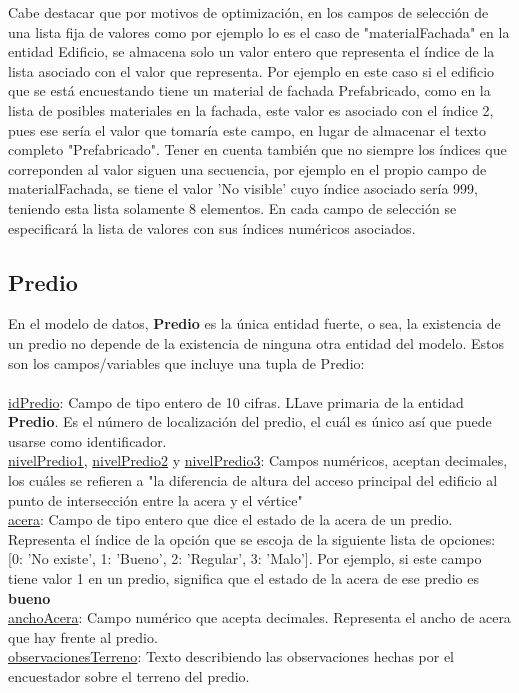 Cabe destacar que por motivos de optimización, en los campos de selección de una lista fija de valores como por ejemplo lo es el caso de "materialFachada" en la entidad Edificio, se almacena solo un valor entero que representa el índice de
la lista asociado con el valor que representa. Por ejemplo en este caso si el edificio que se está encuestando tiene un material de fachada Prefabricado, como en la lista de posibles materiales en la fachada, este valor es asociado con el índice 2,
pues ese sería el valor que tomaría este campo, en lugar de almacenar el texto completo "Prefabricado". Tener en cuenta también que no siempre los índices que correponden al valor siguen una secuencia, por ejemplo en el propio campo de materialFachada,
se tiene el valor 'No visible' cuyo índice asociado sería 999, teniendo esta lista solamente 8 elementos. En cada campo de selección se especificará la lista de valores con sus índices numéricos asociados.
\subsection{Predio}
En el modelo de datos, \textbf{Predio} es la única entidad fuerte, o sea, la existencia de un predio no depende de la existencia de ninguna otra entidad del modelo. Estos son los campos/variables que incluye una tupla de Predio:\\\\
\underline{idPredio}: Campo de tipo entero de 10 cifras. LLave primaria de la entidad \textbf{Predio}. Es el número de localización del predio, el cuál es único así que puede usarse como identificador.\\
\underline{nivelPredio1}, \underline{nivelPredio2} y \underline{nivelPredio3}: Campos numéricos, aceptan decimales, los cuáles se refieren a "la
diferencia de altura del acceso principal del edificio al punto de intersección entre la acera y el vértice"\\
\underline{acera}: Campo de tipo entero que dice el estado de la acera de un predio. Representa el índice de la opción que se escoja de la siguiente lista de opciones: [0: 'No existe', 1: 'Bueno', 2: 'Regular', 3: 'Malo']. Por ejemplo,
si este campo tiene valor 1 en un predio, significa que el estado de la acera de ese predio es \textbf{bueno}\\
\underline{anchoAcera}: Campo numérico que acepta decimales. Representa el ancho de acera que hay frente al predio.\\
\underline{observacionesTerreno}: Texto describiendo las observaciones hechas por el encuestador sobre el terreno del predio.\\\\
